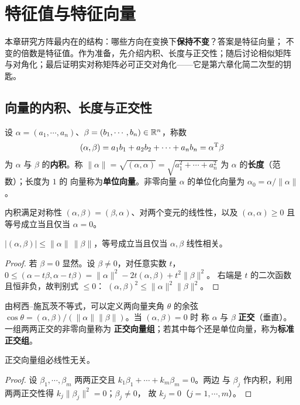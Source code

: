 \chapter{特征值与特征向量}

本章研究方阵最内在的结构：哪些方向在变换下\textbf{保持不变}？答案是特征向量；
不变的倍数是特征值。作为准备，先介绍内积、长度与正交性；随后讨论相似矩阵
与对角化；最后证明实对称矩阵必可正交对角化——它是第六章化简二次型的钥匙。

\section{向量的内积、长度与正交性}

\begin{definition}\label{def:inner-product}
设 $\alpha=(a_1,\cdots,a_n)$、$\beta=(b_1,\cdots,b_n)\in\mathbb{R}^n$，称数
\[
  (\alpha,\beta)=a_1b_1+a_2b_2+\cdots+a_nb_n=\alpha^{\mathrm{T}}\beta
\]
为 $\alpha$ 与 $\beta$ 的\textbf{内积}。称 $\|\alpha\|=\sqrt{(\alpha,\alpha)}
=\sqrt{a_1^2+\cdots+a_n^2}$ 为 $\alpha$ 的\textbf{长度}（范数）；长度为 $1$ 的
向量称为\textbf{单位向量}。非零向量 $\alpha$ 的单位化向量为
$\alpha_0=\alpha/\|\alpha\|$。
\end{definition}

内积满足对称性 $(\alpha,\beta)=(\beta,\alpha)$、对两个变元的线性性，以及
$(\alpha,\alpha)\ge0$ 且等号成立当且仅当 $\alpha=0$。

\begin{theorem}[柯西--施瓦茨不等式]\label{thm:schwarz}
$|(\alpha,\beta)|\le\|\alpha\|\,\|\beta\|$，等号成立当且仅当 $\alpha,\beta$
线性相关。
\end{theorem}
\begin{proof}
若 $\beta=0$ 显然。设 $\beta\neq0$，对任意实数 $t$，
$0\le(\alpha-t\beta,\alpha-t\beta)=\|\alpha\|^2-2t(\alpha,\beta)+t^2\|\beta\|^2$。
右端是 $t$ 的二次函数且恒非负，故判别式 $\le0$：
$(\alpha,\beta)^2\le\|\alpha\|^2\|\beta\|^2$。
\end{proof}

由柯西--施瓦茨不等式，可以定义两向量夹角 $\theta$ 的余弦
$\cos\theta=(\alpha,\beta)/(\|\alpha\|\|\beta\|)$。当 $(\alpha,\beta)=0$ 时
称 $\alpha$ 与 $\beta$ \textbf{正交}（垂直）。一组两两正交的非零向量称为
\textbf{正交向量组}；若其中每个还是单位向量，称为\textbf{标准正交组}。

\begin{theorem}\label{thm:orthogonal-independent}
正交向量组必线性无关。
\end{theorem}
\begin{proof}
设 $\beta_1,\cdots,\beta_m$ 两两正交且 $k_1\beta_1+\cdots+k_m\beta_m=0$。两边
与 $\beta_j$ 作内积，利用两两正交性得 $k_j\|\beta_j\|^2=0$；$\beta_j\neq0$，
故 $k_j=0$（$j=1,\cdots,m$）。
\end{proof}

